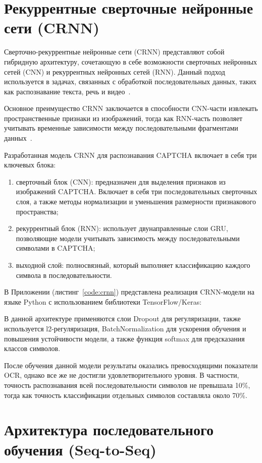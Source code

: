 \documentclass{altsu-report}
\begin{document}
\section{Рекуррентные сверточные нейронные сети (CRNN)}

Сверточно-рекуррентные нейронные сети (CRNN) представляют собой гибридную архитектуру, сочетающую в себе возможности сверточных нейронных сетей (CNN) и рекуррентных нейронных сетей (RNN). Данный подход используется в задачах, связанных с обработкой последовательных данных, таких как распознавание текста, речь и видео~\cite{CRNNHabr}.

Основное преимущество CRNN заключается в способности CNN-части извлекать пространственные признаки из изображений, тогда как RNN-часть позволяет учитывать временные зависимости между последовательными фрагментами данных~\cite{CRNNBook}.

Разработанная модель CRNN для распознавания CAPTCHA включает в себя три ключевых блока:
\begin{enumerate}
    \item сверточный блок (CNN): предназначен для выделения признаков из изображений CAPTCHA. Включает в себя три последовательных сверточных слоя, а также методы нормализации и уменьшения размерности признакового пространства;
    \item рекуррентный блок (RNN): использует двунаправленные слои GRU, позволяющие модели учитывать зависимость между последовательными символами в CAPTCHA;
    \item выходной слой: полносвязный, который выполняет классификацию каждого символа в последовательности.
\end{enumerate}

В Приложении (листинг~\ref{code:crnn}) представлена реализация CRNN-модели на языке Python с использованием библиотеки TensorFlow/Keras:

В данной архитектуре применяются слои Dropout для регуляризации, также используется l2-регуляризация, BatchNormalization для ускорения обучения и повышения устойчивости модели, а также функция softmax для предсказания классов символов.

После обучения данной модели результаты оказались превосходящими показатели OCR, однако все же не достигли удовлетворительного уровня. В частности, точность распознавания всей последовательности символов не превышала 10\%, тогда как точность классификации отдельных символов составляла около 70\%.

\section{Архитектура последовательного обучения (Seq-to-Seq)}
\end{document}
